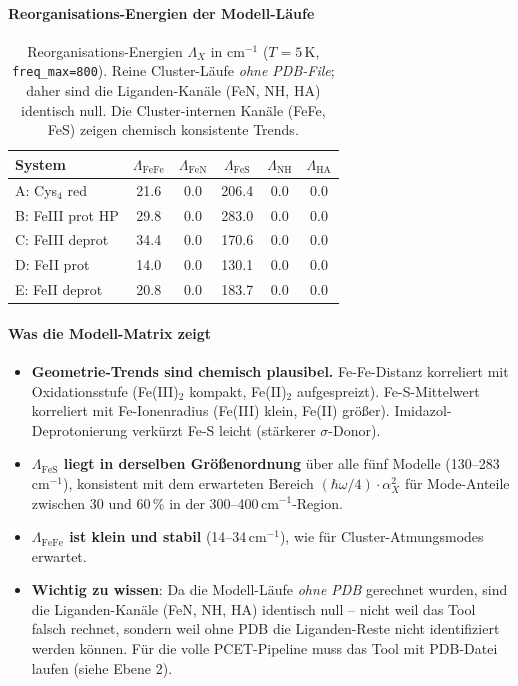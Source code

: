 \documentclass[11pt,a4paper,twoside]{article}
\theoremstyle{remark}
\begin{document}
\paragraph{Reorganisations-Energien der Modell-L\"aufe}

\begin{table}[h]
\centering
\small
\begin{tabular}{|l|c|c|c|c|c|}
\hline
\textbf{System} & $\Lambda_\text{FeFe}$ & $\Lambda_\text{FeN}$ &
  $\Lambda_\text{FeS}$ & $\Lambda_\text{NH}$ & $\Lambda_\text{HA}$ \\
\hline
A: Cys$_4$ red       & 21.6 & 0.0 & 206.4 & 0.0 & 0.0 \\
B: FeIII prot HP   & 29.8 & 0.0 & 283.0 & 0.0 & 0.0 \\
C: FeIII deprot      & 34.4 & 0.0 & 170.6 & 0.0 & 0.0 \\
D: FeII prot         & 14.0 & 0.0 & 130.1 & 0.0 & 0.0 \\
E: FeII deprot       & 20.8 & 0.0 & 183.7 & 0.0 & 0.0 \\
\hline
\end{tabular}
\caption{Reorganisations-Energien $\Lambda_X$ in cm$^{-1}$
($T=5$\,K, \texttt{freq\_max=800}). Reine Cluster-L\"aufe
\emph{ohne PDB-File}; daher sind die Liganden-Kan\"ale (FeN, NH, HA)
identisch null. Die Cluster-internen Kan\"ale (FeFe, FeS) zeigen
chemisch konsistente Trends.}
\label{tab:val-reorg-modell}
\end{table}

\paragraph{Was die Modell-Matrix zeigt}
\begin{itemize}\setlength{\itemsep}{0pt}
  \item \textbf{Geometrie-Trends sind chemisch plausibel.}
        Fe-Fe-Distanz korreliert mit Oxidationsstufe (Fe(III)$_2$
        kompakt, Fe(II)$_2$ aufgespreizt). Fe-S-Mittelwert
        korreliert mit Fe-Ionenradius (Fe(III) klein, Fe(II)
        gr\"o{\ss}er). Imidazol-Deprotonierung verk\"urzt Fe-S leicht
        (st\"arkerer $\sigma$-Donor).
  \item \textbf{$\Lambda_\text{FeS}$ liegt in derselben Gr\"o{\ss}enordnung}
        \"uber alle f\"unf Modelle (130--283\,cm$^{-1}$), konsistent
        mit dem erwarteten Bereich
        $(\hbar\omega/4)\cdot\alpha_X^2$ f\"ur Mode-Anteile zwischen
        30 und 60\,\% in der 300--400\,cm$^{-1}$-Region.
  \item \textbf{$\Lambda_\text{FeFe}$ ist klein und stabil}
        (14--34\,cm$^{-1}$), wie f\"ur Cluster-Atmungsmodes
        erwartet.
  \item \textbf{Wichtig zu wissen}: Da die Modell-L\"aufe \emph{ohne PDB}
        gerechnet wurden, sind die Liganden-Kan\"ale (FeN, NH, HA)
        identisch null -- nicht weil das Tool falsch rechnet,
        sondern weil ohne PDB die Liganden-Reste nicht
        identifiziert werden k\"onnen. F\"ur die volle PCET-Pipeline
        muss das Tool mit PDB-Datei laufen (siehe Ebene 2).
\end{itemize}
\end{document}
